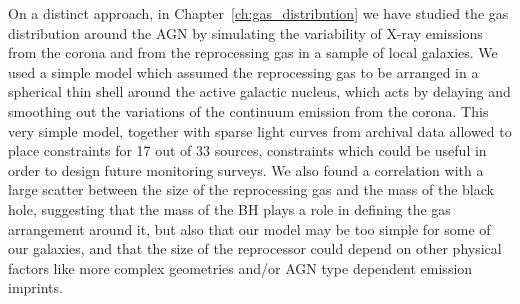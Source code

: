 \vspace{10pt}
On a distinct approach, in Chapter~\ref{ch:gas_distribution} we have studied the gas distribution around the AGN by simulating the variability of X-ray emissions from the corona and from the reprocessing gas in a sample of local galaxies. We used a simple model which assumed the reprocessing gas to be arranged in a spherical thin shell around the active galactic nucleus, which acts by delaying and smoothing out the variations of the continuum emission from the corona. This very simple model, together with sparse light curves from archival data allowed to place constraints for 17 out of 33 sources, constraints which could be useful in order to design future monitoring surveys. We also found a correlation with a large scatter between the size of the reprocessing gas and the mass of the black hole, suggesting that the mass of the BH plays a role in defining the gas arrangement around it, but also that our model may be too simple for some of our galaxies, and that the size of the reprocessor could depend on other physical factors like more complex geometries and/or AGN type dependent emission imprints. 